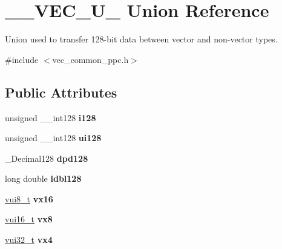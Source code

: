 \hypertarget{union____VEC__U__128}{
\section{\_\-\_\-VEC\_\-U\_ Union Reference}
\label{union____VEC__U__128}
}


Union used to transfer 128-\/bit data between vector and non-\/vector types.  


{\ttfamily \#include $<$vec\_\-common\_\-ppc.h$>$}\subsection*{Public Attributes}
\begin{DoxyCompactItemize}
\item 
\hypertarget{union____VEC__U__128_acc051e98e73262bc1efb27fe5749b676}{
unsigned \_\-\_\-int128 {\bfseries i128}}
\label{union____VEC__U__128_acc051e98e73262bc1efb27fe5749b676}

\item 
\hypertarget{union____VEC__U__128_a47abea276c202e320585bd1558a6a050}{
unsigned \_\-\_\-int128 {\bfseries ui128}}
\label{union____VEC__U__128_a47abea276c202e320585bd1558a6a050}

\item 
\hypertarget{union____VEC__U__128_a19e0b9960892e2d8f293cfd96d5a0add}{
\_\-Decimal128 {\bfseries dpd128}}
\label{union____VEC__U__128_a19e0b9960892e2d8f293cfd96d5a0add}

\item 
\hypertarget{union____VEC__U__128_ae25622f33ef7e6c582fa17d92cb46b3a}{
long double {\bfseries ldbl128}}
\label{union____VEC__U__128_ae25622f33ef7e6c582fa17d92cb46b3a}

\item 
\hypertarget{union____VEC__U__128_afc139eadbad692ee23312ab3d1552a91}{
\hyperlink{vec__common__ppc_8h_aed458e4755a6589049b936cf9f24f6f8}{vui8\_\-t} {\bfseries vx16}}
\label{union____VEC__U__128_afc139eadbad692ee23312ab3d1552a91}

\item 
\hypertarget{union____VEC__U__128_a46097d9d072de1a6bd7685a3c61950a4}{
\hyperlink{vec__common__ppc_8h_afb47075b07673afbf78f8c60298f3712}{vui16\_\-t} {\bfseries vx8}}
\label{union____VEC__U__128_a46097d9d072de1a6bd7685a3c61950a4}

\item 
\hypertarget{union____VEC__U__128_a82e1ef20f9be0f344790ae6d67f199e7}{
\hyperlink{vec__common__ppc_8h_a2ff4a776536870e01b7c9e454586544b}{vui32\_\-t} {\bfseries vx4}}
\label{union____VEC__U__128_a82e1ef20f9be0f344790ae6d67f199e7}


\end{DoxyCompactItemize}
